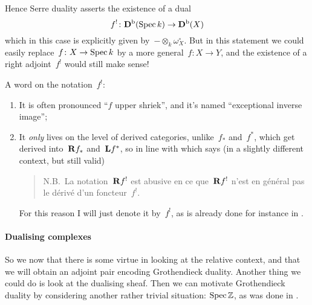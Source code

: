 Hence Serre duality asserts the existence of a dual
\begin{equation}
  f^!\colon\mathbf{D}^{\mathrm{b}}(\operatorname{Spec} k)\to\mathbf{D}^{\mathrm{b}}(X)
\end{equation}
which in this case is explicitly given by~$-\otimes_k\omega_X^\circ$. But in this statement we could easily replace~$f\colon X\to\operatorname{Spec} k$ by a more general~$f\colon X\to Y$, and the existence of a right adjoint~$f^!$ would still make sense!

A word on the notation~$f^!$:
\begin{enumerate}
  \item It is often pronounced ``$f$ upper shriek'', and it's named ``exceptional inverse image'';
  \item It \emph{only} lives on the level of derived categories, unlike~$f_*$ and~$f^*$, which get derived into~$\mathbf{R} f_*$ and~$\mathbf{L} f^*$, so in line with \cite[\S 3.1, \'expos\'e XVIII]{sga43} which says (in a slightly different context, but still valid)
    \begin{quote}
      N.B.\ La notation~$\mathbf{R} f^!$ est abusive en ce que~$\mathbf{R} f^!$ n'est en g\'en\'eral pas le d\'eriv\'e d'un foncteur~$f^!$.
    \end{quote}
    For this reason I will just denote it by~$f^!$, as is already done for instance in \cite{hartshorne-residues-and-duality}.
\end{enumerate}


\paragraph{Dualising complexes}
So we now that there is some virtue in looking at the relative context, and that we will obtain an adjoint pair encoding Grothendieck duality. Another thing we could do is look at the dualising sheaf. Then we can motivate Grothendieck duality by considering another rather trivial situation: $\operatorname{Spec}\mathbb{Z}$, as was done in \cite[\S V.1]{hartshorne-residues-and-duality}.

